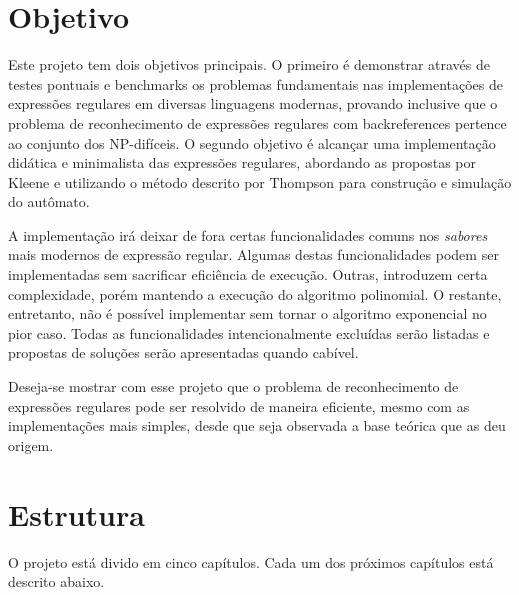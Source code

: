 \documentclass[a4paper,12pt,oneside,onecolumn]{uerj}
\begin{document}
\section{Objetivo}

Este projeto tem dois objetivos principais. O primeiro é demonstrar através de testes pontuais e benchmarks os problemas fundamentais nas implementações de expressões regulares em diversas linguagens modernas, provando inclusive que o problema de reconhecimento de expressões regulares com backreferences pertence ao conjunto dos NP-difíceis. O segundo objetivo é alcançar uma implementação didática e minimalista das expressões regulares, abordando as propostas por Kleene e utilizando o método descrito por Thompson para construção e simulação do autômato.

A implementação irá deixar de fora certas funcionalidades comuns nos \emph{sabores} mais modernos de expressão regular. Algumas destas funcionalidades podem ser implementadas sem sacrificar eficiência de execução. Outras, introduzem certa complexidade, porém mantendo a execução do algoritmo polinomial. O restante, entretanto, não é possível implementar sem tornar o algoritmo exponencial no pior caso. Todas as funcionalidades intencionalmente excluídas serão listadas e propostas de soluções serão apresentadas quando cabível.

Deseja-se mostrar com esse projeto que o problema de reconhecimento de expressões regulares pode ser resolvido de maneira eficiente, mesmo com as implementações mais simples, desde que seja observada a base teórica que as deu origem.

\section{Estrutura}

O projeto está divido em cinco capítulos. Cada um dos próximos capítulos está descrito abaixo.
\end{document}
